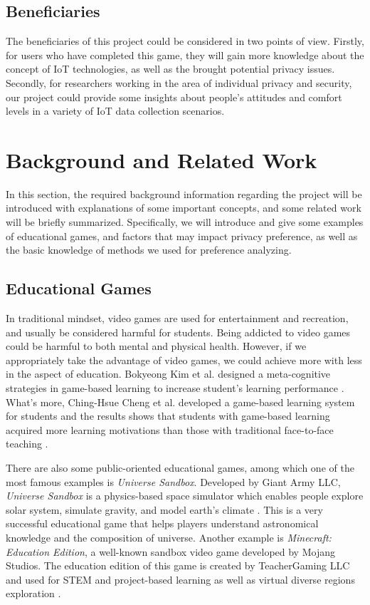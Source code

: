 \documentclass[a4paper,11pt]{article}
\begin{document}
\subsection{Beneficiaries}

The beneficiaries of this project could be considered in two points of view. Firstly, for users who have completed this game, they will gain more knowledge about the concept of IoT technologies, as well as the brought potential privacy issues. Secondly, for researchers working in the area of individual privacy and security, our project could provide some insights about people's attitudes and comfort levels in a variety of IoT data collection scenarios.




\section{Background and Related Work}

In this section, the required background information regarding the project will be introduced with explanations of some important concepts, and some related work will be briefly summarized. Specifically, we will introduce and give some examples of educational games, and factors that may impact privacy preference, as well as the basic knowledge of methods we used for preference analyzing.

\subsection{Educational Games}
In traditional mindset, video games are used for entertainment and recreation, and usually be considered harmful for students. Being addicted to video games could be harmful to both mental and physical health. However, if we appropriately take the advantage of video games, we could achieve more with less in the aspect of education. Bokyeong Kim et al. designed a meta-cognitive strategies in game-based learning to increase student's learning performance \cite{KIM2009800}. What's more, Ching-Hsue Cheng et al. developed a game-based learning system for students and the results shows that students with game-based learning acquired more learning motivations than those with traditional face-to-face teaching \cite{CHENG2012669}.

There are also some public-oriented educational games, among which one of the most famous examples is \textit{Universe Sandbox}. Developed by Giant Army LLC, \textit{Universe Sandbox} is a physics-based space simulator which enables people explore solar system, simulate gravity, and model earth's climate \cite{Universe}. This is a very successful educational game that helps players understand astronomical knowledge and the composition of universe. Another example is \textit{Minecraft: Education Edition}, a well-known sandbox video game developed by Mojang Studios. The education edition of this game is created by TeacherGaming LLC and used for STEM and project-based learning as well as virtual diverse regions exploration \cite{minecraft}.
\end{document}
